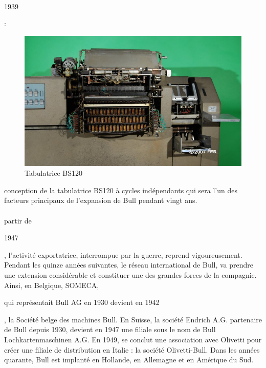 \documentclass[11pt]{article}
\begin{document}
		\paragraph{}
		\begin{bf}1939\end{bf}: \newline{}
		\begin{figure}
		\includegraphics[scale=0.1]{tabulatrice_bs120.jpg}
		\caption{Tabulatrice BS120}
		\end{figure}
		conception de la tabulatrice BS120 à cycles indépendants qui sera l'un des facteurs 
		principaux de l'expansion de Bull pendant vingt ans.
		\paragraph{}
		partir de \begin{bf}1947\end{bf}, l'activité exportatrice, interrompue par la guerre, reprend vigoureusement. 
		Pendant les quinze années suivantes, le réseau international de Bull, va prendre une extension considérable et 
		constituer une des grandes forces de la compagnie. Ainsi, en Belgique, SOMECA, \begin{bf}qui représentait Bull AG en 
		1930 devient en 1942\end{bf}, la Société belge des machines Bull. En Suisse, la société Endrich A.G. partenaire de 
		Bull depuis 1930, devient en 1947 une filiale sous le nom de Bull Lochkartenmaschinen A.G. En 1949, se conclut une 
		association avec Olivetti pour créer une filiale de distribution en Italie : la société Olivetti-Bull. Dans les années 
		quarante, Bull est implanté en Hollande, en Allemagne et en Amérique du Sud.
\end{document}

